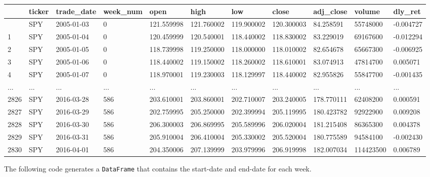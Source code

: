 \documentclass[
  letterpaper,
  DIV=11,
  numbers=noendperiod]{scrreprt}
\begin{document}
\begin{longtable}[]{@{}lllllllllll@{}}
\toprule\noalign{}
& ticker & trade\_date & week\_num & open & high & low & close &
adj\_close & volume & dly\_ret \\
\midrule\noalign{}
\endhead
\bottomrule\noalign{}
\endlastfoot
0 & SPY & 2005-01-03 & 0 & 121.559998 & 121.760002 & 119.900002 &
120.300003 & 84.258591 & 55748000 & -0.004727 \\
1 & SPY & 2005-01-04 & 0 & 120.459999 & 120.540001 & 118.440002 &
118.830002 & 83.229019 & 69167600 & -0.012294 \\
2 & SPY & 2005-01-05 & 0 & 118.739998 & 119.250000 & 118.000000 &
118.010002 & 82.654678 & 65667300 & -0.006925 \\
3 & SPY & 2005-01-06 & 0 & 118.440002 & 119.150002 & 118.260002 &
118.610001 & 83.074913 & 47814700 & 0.005071 \\
4 & SPY & 2005-01-07 & 0 & 118.970001 & 119.230003 & 118.129997 &
118.440002 & 82.955826 & 55847700 & -0.001435 \\
... & ... & ... & ... & ... & ... & ... & ... & ... & ... & ... \\
2826 & SPY & 2016-03-28 & 586 & 203.610001 & 203.860001 & 202.710007 &
203.240005 & 178.770111 & 62408200 & 0.000591 \\
2827 & SPY & 2016-03-29 & 586 & 202.759995 & 205.250000 & 202.399994 &
205.119995 & 180.423782 & 92922900 & 0.009208 \\
2828 & SPY & 2016-03-30 & 586 & 206.300003 & 206.869995 & 205.589996 &
206.020004 & 181.215408 & 86365300 & 0.004378 \\
2829 & SPY & 2016-03-31 & 586 & 205.910004 & 206.410004 & 205.330002 &
205.520004 & 180.775589 & 94584100 & -0.002430 \\
2830 & SPY & 2016-04-01 & 586 & 204.350006 & 207.139999 & 203.979996 &
206.919998 & 182.007034 & 114423500 & 0.006789 \\
\end{longtable}

The following code generates a \texttt{DataFrame} that contains the
start-date and end-date for each week.
\end{document}
